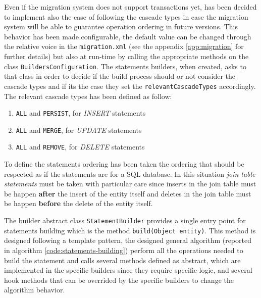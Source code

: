 \newparagraph Even if the migration system does not support transactions yet, has been decided to implement also the case of following the cascade types in case the migration system will be able to guarantee operation ordering in future versions.
This behavior has been made configurable, the default value can be changed through the relative voice in the \texttt{migration.xml} (see the appendix \ref{app:migration} for further details) but also at run-time by calling the appropriate methods on the class \texttt{BuildersConfiguration}. The statements builders, when created, asks to that class in order to decide if the build process should or not consider the cascade types and if its the case they set the \texttt{relevantCascadeTypes} accordingly.
The relevant cascade types has been defined as follow:
\begin{enumerate}
\item \texttt{ALL} and \texttt{PERSIST}, for \textit{INSERT} statements
\item \texttt{ALL} and \texttt{MERGE}, for \textit{UPDATE} statements
\item \texttt{ALL} and \texttt{REMOVE}, for \textit{DELETE} statements
\end{enumerate}
\noindent To define the statements ordering has been taken the ordering that should be respected as if the statements are for a SQL database. In this situation \textit{join table statements} must be taken with particular care since inserts in the join table must be happen \textbf{after} the insert of the entity itself and deletes in the join table must be happen \textbf{before} the delete of the entity itself.

\newparagraph The builder abstract class \texttt{StatementBuilder} provides a single entry point for statements building which is the method \texttt{build(Object entity)}. This method is designed following a template pattern, the designed general algorithm (reported in algorithm \ref{code:statements-building}) perform all the operations needed to   build the statement and calls several methods defined as abstract, which are implemented in the specific builders since they require specific logic, and several hook methods that can be overrided by the specific builders to change the algorithm behavior.

